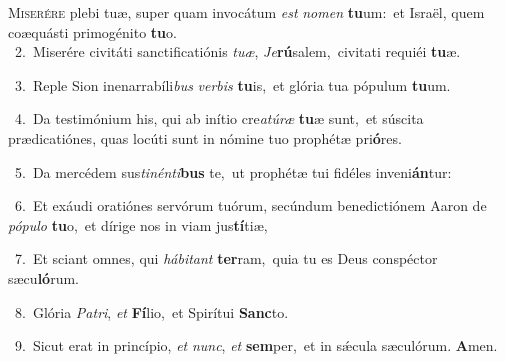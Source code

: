 \lettrine{\initial\textcolor{\initialcolor}{M}}{iserére} plebi tuæ, super quam invocátum \textit{est} \textit{no}\-\textit{men} \textbf{tu}\-um:~\star et Israël, quem coæquásti primogénito \textbf{tu}\-o.\\
{\numbfont\textcolor{\numbcolor}{~2.}}~Miserére civitáti sanctificatiónis \textit{tu}\-\textit{æ}, \textit{Je}\-\textbf{rú}salem,~\star civitati requiéi \textbf{tu}\-æ.\par
{\numbfont\textcolor{\numbcolor}{~3.}}~Reple Sion inenarrabíli\textit{bus} \textit{ver}\-\textit{bis} \textbf{tu}\-is,~\star et glória tua pópulum \textbf{tu}\-um.\par
{\numbfont\textcolor{\numbcolor}{~4.}}~Da testimónium his, qui ab inítio cre\-\textit{a}\-\textit{tú}\textit{ræ} \textbf{tu}\-æ sunt,~\star et súscita prædicatiónes, quas locúti sunt in nómine tuo prophétæ pri\-\textbf{ó}\-res.\par
{\numbfont\textcolor{\numbcolor}{~5.}}~Da mercédem sus\-\textit{ti}\-\textit{nén}\textit{ti}\textbf{bus} te,~\star ut prophétæ tui fidéles inveni\-\textbf{án}\-tur:\par
{\numbfont\textcolor{\numbcolor}{~6.}}~Et exáudi oratiónes servórum tuórum, secúndum benedictiónem Aaron de \textit{pó}\-\textit{pu}\textit{lo} \textbf{tu}\-o,~\star et dírige nos in viam jus\-\textbf{tí}\-tiæ,\par
{\numbfont\textcolor{\numbcolor}{~7.}}~Et sciant omnes, qui \textit{há}\-\textit{bi}\textit{tant} \textbf{ter}\-ram,~\star quia tu es Deus conspéctor sæcu\-\textbf{ló}\-rum.\par
{\numbfont\textcolor{\numbcolor}{~8.}}~Glória \textit{Pa}\-\textit{tri}, \textit{et} \textbf{Fí}\-lio,~\star et Spirítui \textbf{Sanc}\-to.\par
{\numbfont\textcolor{\numbcolor}{~9.}}~Sicut erat in princípio, \textit{et} \textit{nunc}\-, \textit{et} \textbf{sem}\-per,~\star et in sǽcula sæculórum. \textbf{A}\-men.\par

